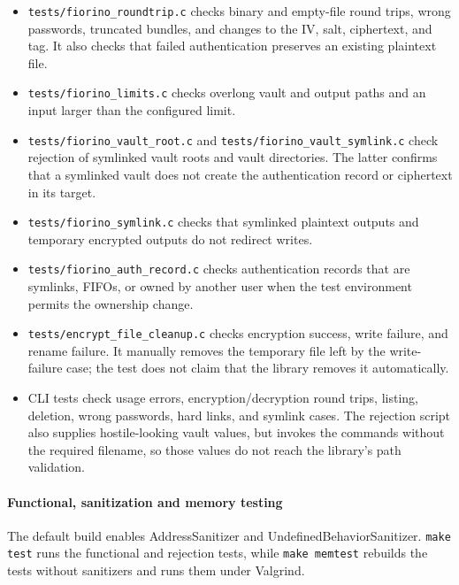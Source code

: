 \begin{itemize}
    \item \texttt{tests/fiorino\_roundtrip.c} checks binary and empty-file
    round trips, wrong passwords, truncated bundles, and changes to the IV,
    salt, ciphertext, and tag. It also checks that failed authentication
    preserves an existing plaintext file.
    \item \texttt{tests/fiorino\_limits.c} checks overlong vault and output
    paths and an input larger than the configured limit.
    \item \texttt{tests/fiorino\_vault\_root.c} and
    \texttt{tests/fiorino\_vault\_symlink.c} check rejection of symlinked
    vault roots and vault directories. The latter confirms that a symlinked
    vault does not create the authentication record or ciphertext in its
    target.
    \item \texttt{tests/fiorino\_symlink.c} checks that symlinked plaintext
    outputs and temporary encrypted outputs do not redirect writes.
    \item \texttt{tests/fiorino\_auth\_record.c} checks authentication
    records that are symlinks, FIFOs, or owned by another user when the test
    environment permits the ownership change.
    \item \texttt{tests/encrypt\_file\_cleanup.c} checks encryption success,
    write failure, and rename failure. It manually removes the temporary file
    left by the write-failure case; the test does not claim that the library
    removes it automatically.
    \item CLI tests check usage errors, encryption/decryption round trips,
    listing, deletion, wrong passwords, hard links, and symlink cases. The
    rejection script also supplies hostile-looking vault values, but invokes
    the commands without the required filename, so those values do not reach
    the library's path validation.
\end{itemize}

\paragraph{Functional, sanitization and memory testing}
The default build enables AddressSanitizer and UndefinedBehaviorSanitizer.
\texttt{make test} runs the functional and rejection tests, while
\texttt{make memtest} rebuilds the tests without sanitizers and runs them
under Valgrind.
